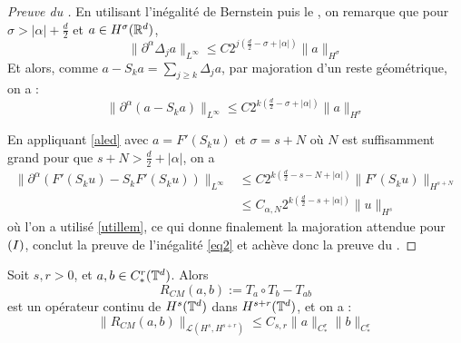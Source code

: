 \documentclass[11pt,a4paper]{article}
\begin{document}
\begin{proof}[Preuve du ]
En utilisant l'inégalité de Bernstein puis le , on remarque que pour $\sigma > |\alpha| + \frac{d}{2}$ et $a\in H^\sigma(\mathbb R^d)$,
\begin{equation*}
\|\partial^\alpha \Delta_j a\|_{L^\infty} \leq C 2^{j(\frac{d}{2}-\sigma+|\alpha|)} \|a\|_{H^\sigma}
\end{equation*}
Et alors, comme $a-S_ka=\sum_{j\geq k} \Delta_j a$, par majoration d'un reste géométrique, on a :
\begin{equation}\label{aled}
\|\partial^\alpha (a-S_k a)\|_{L^\infty} \leq C 2^{k(\frac{d}{2}-\sigma+|\alpha|)} \|a\|_{H^\sigma}
\end{equation}

En appliquant \eqref{aled} avec $a=F'(S_ku)$ et $\sigma = s + N$ où $N$ est suffisamment grand pour que $s+N > \frac{d}{2} + |\alpha|$, on a 
\begin{align*}
\|\partial^\alpha (F'(S_ku)-S_k F'(S_ku))\|_{L^\infty} &\leq C 2^{k(\frac{d}{2}-s-N+|\alpha|)} \|F'(S_ku)\|_{H^{s+N}} \\
& \leq  C_{\alpha,N} 2^{k(\frac{d}{2}-s+|\alpha|)} \|u\|_{H^s}
\end{align*}
où l'on a utilisé \eqref{utillem}, ce qui donne finalement la majoration attendue pour $(\rom{1})$, conclut la preuve de l'inégalité \eqref{eq2} et achève donc la preuve du .
\end{proof}

\begin{thm}\label{paralin_prod}
Soit $s,r>0$, et $a,b\in C^r_*(\mathbb T^d)$. Alors 
\begin{equation*}
R_{CM}(a,b) := T_a \circ T_b - T_{ab}
\end{equation*}
est un opérateur continu de $H^s(\mathbb T^d)$ dans $H^{s+r}(\mathbb T^d)$, et on a :
\begin{equation*}
\|R_{CM}(a,b)\|_{\mathcal{L}(H^s,H^{s+r})} \leq C_{s,r} \|a\|_{C^r_*}\|b\|_{C^r_*}
\end{equation*}
\end{thm}
\end{document}
